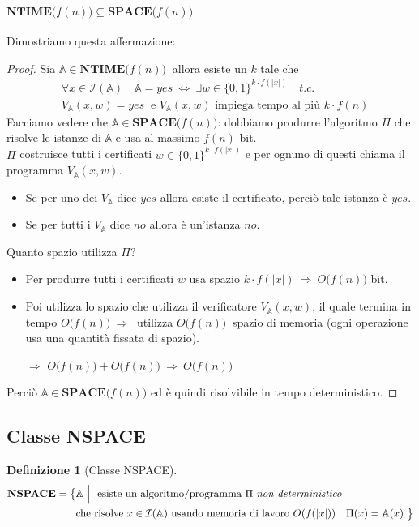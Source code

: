 \documentclass[a4paper]{article}
\theoremstyle{definition}
\newtheorem{definit}{Definizione}[subsection]
\newcommand{\ntime}{\mathbf{NTIME}}
\newcommand{\Space}{\mathbf{SPACE}}
\newcommand{\nspace}{\mathbf{NSPACE}}
\newcommand{\prob}[1]{\mathbb{#1}}
\newcommand{\instance}[1]{\mathcal{I}(\prob{#1})}
\begin{document}
			\paragraph{$ \ntime\big(f(n)\big) \subseteq \Space\big(f(n)\big) $} Dimostriamo questa affermazione:
			\begin{proof}
				
			Sia $ \prob{A} \in \ntime\big(f(n)\big) \ $ allora esiste un $ k $ tale che 
			\begin{align*}
				&\forall x \in \instance{A} \quad \prob{A} = yes\ \Leftrightarrow \ \exists w \in \{0, 1\}^{k\cdot f(|x|)} \quad t.c. \\ 
				&V_{\prob{A}}(x, w) = yes\ \text{ e } V_{\prob{A}}(x, w) \text{ impiega tempo al più } k\cdot f(n)
			\end{align*}
			Facciamo vedere che $ \prob{A} \in \Space\big(f(n)\big) $: dobbiamo produrre l'algoritmo $ \Pi $ che risolve le istanze di $ \prob{A} $ e usa al massimo $ f(n) $ bit.\\
			$ \Pi $ costruisce tutti i certificati $ w \in \{0, 1\}^{k\cdot f(|x|)} $ e per ognuno di questi chiama il programma $ V_{\prob{A}}(x, w) $. 
			\begin{itemize}
				\item Se per uno dei $ V_{\prob{A}} $ dice $ yes $ allora esiste il certificato, perciò tale istanza è $ yes $.
				\item Se per tutti i $ V_{\prob{A}} $ dice $ no $ allora è un'istanza $ no $.
			\end{itemize}
			Quanto spazio utilizza $ \Pi $?
			\begin{itemize}
				\item Per produrre tutti i certificati $ w $ usa spazio $ k\cdot f(|x|)\ \Rightarrow\ O\big(f(n)\big) $ bit.
				\item Poi utilizza lo spazio che utilizza il verificatore $ V_{\prob{A}}(x, w) $, il quale termina in tempo $ O\big(f(n)\big)\ \Rightarrow\  $ utilizza $ O\big(f(n)\big)\ $ spazio di memoria (ogni operazione usa una quantità fissata di spazio).
				\item[$ \Rightarrow $] $ O\big(f(n)\big) + O\big(f(n)\big) \ \Rightarrow\ O\big(f(n)\big) $
			\end{itemize}
			Perciò $ \prob{A} \in \Space\big(f(n)\big) $ ed è quindi risolvibile in tempo deterministico.
			
			\end{proof}
		\subsection{Classe NSPACE}
			\begin{definit}[Classe NSPACE]
				\begin{align*}
					\nspace = \big\lbrace & \prob{A}\ \Big| \ \text{ esiste un algoritmo/programma } \Pi \text{ \textit{non deterministico}} \\
					& \text{che risolve } x \in \instance{A} \text{ usando memoria di lavoro } O(f(\vert x\vert)) \quad \Pi(x) = \prob{A}(x) \ \big\rbrace
				\end{align*}
			\end{definit}
		
\end{document}
